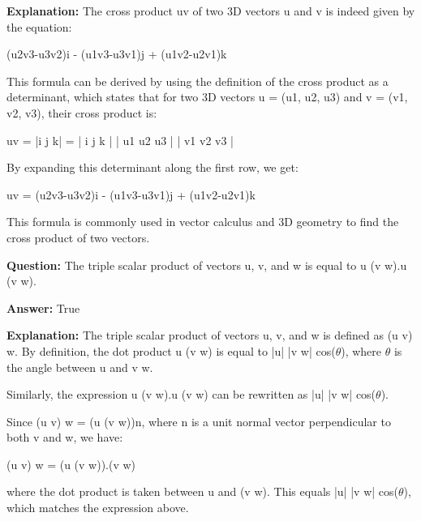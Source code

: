 \documentclass{article}
\begin{document}
                \textbf{Explanation:} The cross product u{\texttimes}v of two 3D vectors u and v is indeed given by the equation:

(u2v3-u3v2)i - (u1v3-u3v1)j + (u1v2-u2v1)k

This formula can be derived by using the definition of the cross product as a determinant, which states that for two 3D vectors u = (u1, u2, u3) and v = (v1, v2, v3), their cross product is:

u{\texttimes}v = |i j k| = 
| i  j  k |
| u1 u2 u3 |
| v1 v2 v3 |

By expanding this determinant along the first row, we get:

u{\texttimes}v = (u2v3-u3v2)i - (u1v3-u3v1)j + (u1v2-u2v1)k

This formula is commonly used in vector calculus and 3D geometry to find the cross product of two vectors.
                
                \vspace{0.5cm} 
        
            
                \textbf {Question:} The triple scalar product of vectors u, v, and w is equal to u {\textperiodcentered} (v {\texttimes} w).u {\textperiodcentered} (v {\texttimes} w).
                
                \textbf{Answer:} True

                \textbf{Explanation:} The triple scalar product of vectors u, v, and w is defined as (u {\textperiodcentered} v) {\texttimes} w. By definition, the dot product u {\textperiodcentered} (v {\texttimes} w) is equal to |u| |v {\texttimes} w| cos(\ensuremath{\theta}), where \ensuremath{\theta} is the angle between u and v {\texttimes} w.

Similarly, the expression u {\textperiodcentered} (v {\texttimes} w).u {\textperiodcentered} (v {\texttimes} w) can be rewritten as |u|{\texttwosuperior} |v {\texttimes} w|{\texttwosuperior} cos{\texttwosuperior}(\ensuremath{\theta}).

Since (u {\textperiodcentered} v) {\texttimes} w = (u {\textperiodcentered} (v {\texttimes} w))n, where n is a unit normal vector perpendicular to both v and w, we have:

(u {\textperiodcentered} v) {\texttimes} w = (u {\textperiodcentered} (v {\texttimes} w)).(v {\texttimes} w)

where the dot product is taken between u and (v {\texttimes} w). This equals |u|{\texttwosuperior} |v {\texttimes} w|{\texttwosuperior} cos{\texttwosuperior}(\ensuremath{\theta}), which matches the expression above.
\end{document}
